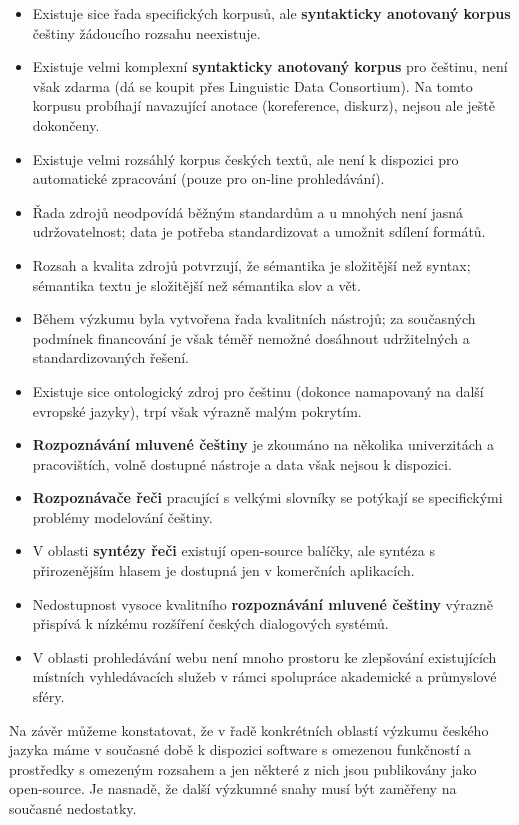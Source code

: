 \begin{multicols}{2}
\begin{itemize}
\item Existuje sice řada specifických korpusů, ale \textbf{syntakticky anotovaný korpus} češtiny žádoucího rozsahu neexistuje.
\item Existuje velmi komplexní \textbf{syntakticky anotovaný korpus} pro češtinu, není však zdarma (dá se koupit přes Linguistic Data Consortium). Na tomto korpusu probíhají navazující anotace (koreference, diskurz), nejsou ale ještě dokončeny.
\item Existuje velmi rozsáhlý korpus českých textů, ale není k dispozici pro automatické zpracování (pouze pro on-line prohledávání).
\item Řada zdrojů neodpovídá běžným standardům a u mnohých není jasná udržovatelnost; data je potřeba standardizovat a umožnit sdílení formátů.
\item Rozsah a kvalita zdrojů potvrzují, že sémantika je složitější než syntax; sémantika textu je složitější než sémantika slov a vět.
\item Během výzkumu byla vytvořena řada kvalitních nástrojů; za současných podmínek financování je však téměř nemožné dosáhnout udržitelných a standardizovaných řešení.
\item Existuje sice ontologický zdroj pro češtinu (dokonce namapovaný na další evropské jazyky), trpí však výrazně malým pokrytím.
\item \textbf{Rozpoznávání mluvené češtiny} je zkoumáno na několika univerzitách a pracovištích, volně dostupné nástroje a data však nejsou k dispozici.
\item \textbf{Rozpoznávače řeči} pracující s velkými slovníky se potýkají se specifickými problémy modelování češtiny.
\item V oblasti \textbf{syntézy řeči} existují open-source balíčky, ale syntéza s přirozenějším hlasem je dostupná jen v komerčních aplikacích.
\item Nedostupnost vysoce kvalitního \textbf{rozpoznávání mluvené češtiny} výrazně přispívá k nízkému rozšíření českých dialogových systémů.
\item V oblasti prohledávání webu není mnoho prostoru ke zlepšování existujících místních vyhledávacích služeb v rámci spolupráce akademické a průmyslové sféry.
\end{itemize}

Na závěr můžeme konstatovat, že v řadě konkrétních oblastí výzkumu českého jazyka máme v současné době k dispozici software s omezenou funkčností a prostředky s omezeným rozsahem a jen některé z nich jsou publikovány jako open-source. Je nasnadě, že další výzkumné snahy musí být zaměřeny na současné nedostatky.


\end{multicols}
